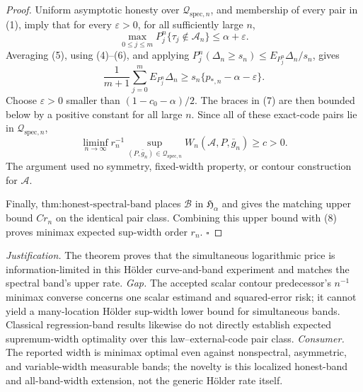 \documentclass{article}
\begin{document}
\begin{proof}
Uniform asymptotic honesty over \(\mathcal Q_{\mathrm{spec},n}\), and membership of every pair in (1), imply that for every \(\varepsilon>0\), for all sufficiently large \(n\),
\[
 \max_{0\le j\le m}P_j^n\{\tau_j\notin\mathcal A_n\}
 \le\alpha+\varepsilon. \tag{6}
\]
Averaging (5), using (4)--(6), and applying
\(P_j^n(\Delta_n\ge s_n)\le E_{P_j^n}\Delta_n/s_n\), gives
\[
 \frac1{m+1}\sum_{j=0}^mE_{P_j^n}\Delta_n
 \ge s_n\{p_{*,n}-\alpha-\varepsilon\}. \tag{7}
\]
Choose \(\varepsilon>0\) smaller than \((1-c_0-\alpha)/2\).  The braces in (7) are then bounded below by a positive constant for all large \(n\).  Since all of these exact-code pairs lie in \(\mathcal Q_{\mathrm{spec},n}\),
\[
 \liminf_{n\to\infty}r_n^{-1}
 \sup_{(P,\bar g_n)\in\mathcal Q_{\mathrm{spec},n}}
 W_n(\mathcal A,P,\bar g_n)\ge c>0. \tag{8}
\]
The argument used no symmetry, fixed-width property, or contour construction for \(\mathcal A\).

Finally, \(\text{thm:honest-spectral-band}\) places \(\mathcal B\) in \(\mathfrak H_\alpha\) and gives the matching upper bound \(Cr_n\) on the identical pair class.  Combining this upper bound with (8) proves minimax expected sup-width order \(r_n\). \(\square\)
\end{proof}
\par\smallskip\noindent \textit{Justification.} The theorem proves that the simultaneous logarithmic price is information-limited in this Hölder curve-and-band experiment and matches the spectral band's upper rate. \textit{Gap.} The accepted scalar contour predecessor's \(n^{-1}\) minimax converse concerns one scalar estimand and squared-error risk; it cannot yield a many-location Hölder sup-width lower bound for simultaneous bands. Classical regression-band results likewise do not directly establish expected supremum-width optimality over this law--external-code pair class. \textit{Consumer.} The reported width is minimax optimal even against nonspectral, asymmetric, and variable-width measurable bands; the novelty is this localized honest-band and all-band-width extension, not the generic Hölder rate itself.
\end{document}
